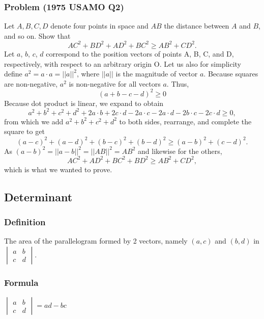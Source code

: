 \documentclass{article}
\begin{document}
\subsubsection{Problem (1975 USAMO Q2)}
Let $A,B,C,D$ denote four points in space and $AB$ the distance between $A$ and $B$, and so on. Show that\[AC^2+BD^2+AD^2+BC^2\ge AB^2+CD^2.\]
Let $a$, $b$, $c$, $d$ correspond to the position vectors of points A, B, C, and D, respectively, with respect to an arbitrary origin O. Let us also for simplicity define $a^2 = a \cdot a = ||a||^2$, where $||a||$ is the magnitude of vector $a$. Because squares are non-negative, $a^2$ is non-negative for all vectors $a$. Thus,\[(a + b - c - d)^2 \ge 0\]Because dot product is linear, we expand to obtain\[a^2 + b^2 + c^2 + d^2 + 2a \cdot b + 2 c \cdot d - 2 a \cdot c - 2 a \cdot d - 2 b \cdot c - 2 c \cdot d \ge 0,\]from which we add $a^2 + b^2 + c^2 + d^2$ to both sides, rearrange, and complete the square to get\[(a-c)^2 + (a-d)^2 + (b-c)^2 + (b-d)^2 \ge (a-b)^2 + (c-d)^2.\]As $(a-b)^2 = ||a-b||^2 = ||AB||^2 = AB^2$ and likewise for the others,\[AC^2 + AD^2 + BC^2 + BD^2 \ge AB^2 + CD^2,\]which is what we wanted to prove.

\pagebreak

\subsection{Determinant}
\subsubsection{Definition}
The area of the parallelogram formed by 2 vectors, namely $(a,c)$ and $(b,d)$ in 
$
\begin{vmatrix}
    a & b\\
    c & d
\end{vmatrix}$.
\subsubsection{Formula}

$
\begin{vmatrix}
    a & b\\
    c & d
\end{vmatrix}
= ad-bc
$
\end{document}
